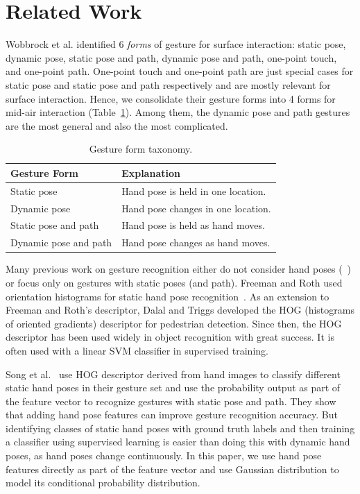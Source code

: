 \documentclass{acm_proc_article-sp}
\begin{document}
\section{Related Work}
Wobbrock et al. \cite{Wobbrock09} identified 6 \textit{forms} of gesture for surface
interaction: static pose, dynamic pose,
static pose and path, dynamic pose and path, one-point touch, and one-point
path. One-point touch and one-point path are just special cases for static pose
and static pose and path respectively and are mostly relevant for surface
interaction. Hence, we consolidate their gesture forms into 4 forms for mid-air interaction
(Table~\ref{tab:gesture-form}).
Among them, the dynamic pose and path gestures are the most general and also the most
complicated. 

\begin{table}
\centering
\caption{Gesture form taxonomy.}
\begin{tabular}{|l|l|} \hline
\textbf{Gesture Form}&\textbf{Explanation}\\ \hline
Static pose & Hand pose is held in one location. \\ \hline
Dynamic pose & Hand pose changes in one location. \\ \hline
Static pose and path & Hand pose is held as hand moves. \\ \hline
Dynamic pose and path & Hand pose changes as hand moves. \\
\hline\end{tabular}
\label{tab:gesture-form}
\end{table}

Many previous work on gesture recognition either do not consider hand poses (~\cite{sharma00,Starner95}) 
or focus only on gestures with static poses (and path). 
Freeman and Roth used orientation histograms for static hand pose recognition~\cite{Freeman94}. 
As an extension to Freeman and Roth's descriptor, Dalal and Triggs developed the  
HOG (histograms of oriented gradients) descriptor \cite{dalal05} for pedestrian
detection. Since then, the HOG descriptor has been used widely
in object recognition with great success. It is often used with a linear SVM
classifier in supervised training. 

Song et al.~\cite{SongDD2011b} use HOG descriptor derived from hand images to classify different
static hand poses in their gesture set and use the probability output as part of the
feature vector to recognize gestures with static pose and path. They show that adding hand
pose features can improve gesture recognition accuracy. But identifying classes of static hand poses with ground truth labels and then training a
classifier using supervised learning is easier than doing this with dynamic hand
poses, as hand poses change continuously. In this paper, we use hand pose features 
directly as part of the feature vector and use Gaussian distribution to model its conditional probability
distribution.
\end{document}
